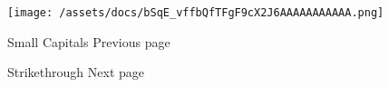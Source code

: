 \texttt{[image: /assets/docs/bSqE\_vffbQfTFgF9cX2J6AAAAAAAAAAA.png]}

\href{/docs/reference/text/smallcaps/}{\pandocbounded{}}

{ Small Capitals } { Previous page }

\href{/docs/reference/text/strike/}{\pandocbounded{}}

{ Strikethrough } { Next page }
